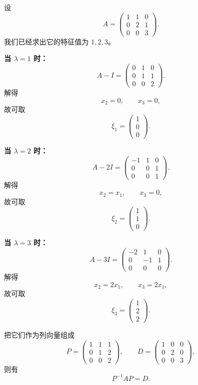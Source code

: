 \documentclass[11pt,oneside,UTF8]{ctexbook}
\begin{document}
\begin{examplebox}[例 7：求特征向量并完成特征值分解]
设
\[
A=
\begin{pmatrix}
1&1&0\\
0&2&1\\
0&0&3
\end{pmatrix}.
\]
我们已经求出它的特征值为 \(1,2,3\)。

\textbf{当 \(\lambda=1\) 时：}
\[
A-I=
\begin{pmatrix}
0&1&0\\
0&1&1\\
0&0&2
\end{pmatrix}.
\]
解得
\[
x_2=0,\qquad x_3=0,
\]
故可取
\[
\xi_1=
\begin{pmatrix}
1\\0\\0
\end{pmatrix}.
\]

\textbf{当 \(\lambda=2\) 时：}
\[
A-2I=
\begin{pmatrix}
-1&1&0\\
0&0&1\\
0&0&1
\end{pmatrix}.
\]
解得
\[
x_2=x_1,\qquad x_3=0,
\]
故可取
\[
\xi_2=
\begin{pmatrix}
1\\1\\0
\end{pmatrix}.
\]

\textbf{当 \(\lambda=3\) 时：}
\[
A-3I=
\begin{pmatrix}
-2&1&0\\
0&-1&1\\
0&0&0
\end{pmatrix}.
\]
解得
\[
x_2=2x_1,\qquad x_3=2x_1,
\]
故可取
\[
\xi_3=
\begin{pmatrix}
1\\2\\2
\end{pmatrix}.
\]

把它们作为列向量组成
\[
P=
\begin{pmatrix}
1&1&1\\
0&1&2\\
0&0&2
\end{pmatrix},
\qquad
D=
\begin{pmatrix}
1&0&0\\
0&2&0\\
0&0&3
\end{pmatrix},
\]
则有
\[
P^{-1}AP=D.
\]
\end{examplebox}
\end{document}

